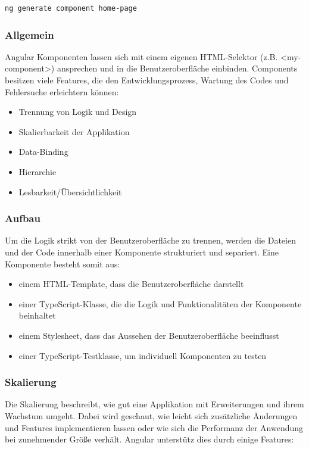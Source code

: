 \begin{lstlisting}[caption={{Terminal - Component erstellen}},language=bash,label=lst:impl:addComponent]
    ng generate component home-page
\end{lstlisting}

\subsubsection{Allgemein}
Angular Komponenten lassen sich mit einem eigenen HTML-Selektor (z.B. <my-component>) ansprechen und in die Benutzeroberfläche einbinden. Components besitzen viele Features, die den Entwicklungsprozess, Wartung des Codes und Fehlersuche erleichtern können:

\begin{itemize}
    \item Trennung von Logik und Design
    \item Skalierbarkeit der Applikation
    \item Data-Binding
    \item Hierarchie
    \item Lesbarkeit/Übersichtlichkeit
\end{itemize}

\subsubsection{Aufbau}
Um die Logik strikt von der Benutzeroberfläche zu trennen, werden die Dateien und der Code innerhalb einer Komponente strukturiert und separiert. Eine Komponente besteht somit aus: 

\begin{itemize}
    \item einem HTML-Template, dass die Benutzeroberfläche darstellt
    \item einer TypeScript-Klasse, die die Logik und Funktionalitäten der Komponente beinhaltet
    \item einem Stylesheet, dass das Aussehen der Benutzeroberfläche beeinflusst
    \item einer TypeScript-Testklasse, um individuell Komponenten zu testen 
\end{itemize}

\cite{AngularComponentOverview}

\subsubsection{Skalierung}
Die Skalierung beschreibt, wie gut eine Applikation mit Erweiterungen und ihrem Wachstum umgeht. Dabei wird geschaut, wie leicht sich zusätzliche Änderungen und Features implementieren lassen oder wie sich die Performanz der Anwendung bei zunehmender Größe verhält. Angular unterstütz dies durch einige Features:

